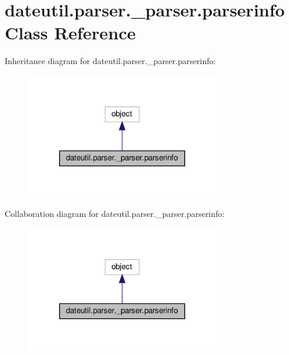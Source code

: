 \hypertarget{classdateutil_1_1parser_1_1__parser_1_1parserinfo}{}\section{dateutil.\+parser.\+\_\+parser.\+parserinfo Class Reference}
\label{classdateutil_1_1parser_1_1__parser_1_1parserinfo}


Inheritance diagram for dateutil.\+parser.\+\_\+parser.\+parserinfo\+:
\nopagebreak
\begin{figure}[H]
\begin{center}
\leavevmode
\includegraphics[width=239pt]{classdateutil_1_1parser_1_1__parser_1_1parserinfo__inherit__graph}
\end{center}
\end{figure}


Collaboration diagram for dateutil.\+parser.\+\_\+parser.\+parserinfo\+:
\nopagebreak
\begin{figure}[H]
\begin{center}
\leavevmode
\includegraphics[width=239pt]{classdateutil_1_1parser_1_1__parser_1_1parserinfo__coll__graph}
\end{center}
\end{figure}
